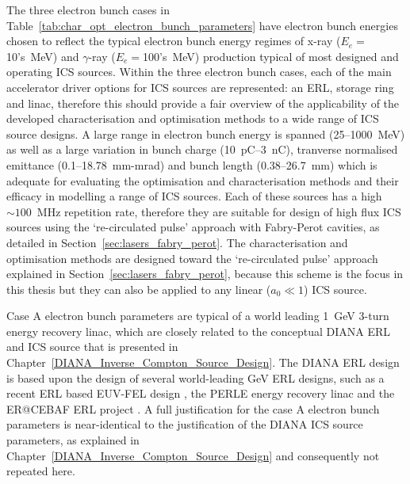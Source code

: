 \documentclass[../main.tex]{subfiles}
\begin{document}
The three electron bunch cases in Table~\ref{tab:char_opt_electron_bunch_parameters} have electron bunch energies chosen to reflect the typical electron bunch energy regimes of x-ray ($E_{e} =$10's~\si{\mega\electronvolt}) and $\gamma$-ray ($E_{e} =$100's~\si{\mega\electronvolt}) production typical of most designed and operating ICS sources. Within the three electron bunch cases, each of the main accelerator driver options for ICS sources are represented: an ERL, storage ring and linac, therefore this should provide a fair overview of the applicability of the developed characterisation and optimisation methods to a wide range of ICS source designs. A large range in electron bunch energy is spanned (25--1000~\si{\mega\electronvolt}) as well as a large variation in bunch charge (10~\si{\pico\coulomb}--3~\si{\nano\coulomb}), tranverse normalised emittance (0.1--18.78~\si{\milli\meter}-\si{\milli\radian}) and bunch length (0.38--26.7~\si{\milli\meter}) which is adequate for evaluating the optimisation and characterisation methods and their efficacy in modelling a range of ICS sources. Each of these sources has a high $\sim100$~\si{\mega\hertz} repetition rate, therefore they are suitable for design of high flux ICS sources using the `re-circulated pulse' approach with Fabry-Perot cavities, as detailed in Section~\ref{sec:lasers_fabry_perot}. The characterisation and optimisation methods are designed toward the `re-circulated pulse' approach explained in Section~\ref{sec:lasers_fabry_perot}, because this scheme is the focus in this thesis but they can also be applied to any linear ($a_{0}\ll 1$) ICS source. 

Case A electron bunch parameters are typical of a world leading 1~\si{\giga\electronvolt} 3-turn energy recovery linac, which are closely related to the conceptual DIANA ERL and ICS source that is presented in Chapter~\ref{DIANA_Inverse_Compton_Source_Design}. The DIANA ERL design is based upon the design of several world-leading \si{\giga\electronvolt} ERL designs, such as a recent ERL based EUV-FEL design \cite{akkermans2017compact}, the PERLE energy recovery linac \cite{angal2018perle} and the ER@CEBAF ERL project \cite{meot2016er,bogacz2016er}. A full justification for the case A electron bunch parameters is near-identical to the justification of the DIANA ICS source parameters, as explained in Chapter~\ref{DIANA_Inverse_Compton_Source_Design} and consequently not repeated here.       
\end{document}
